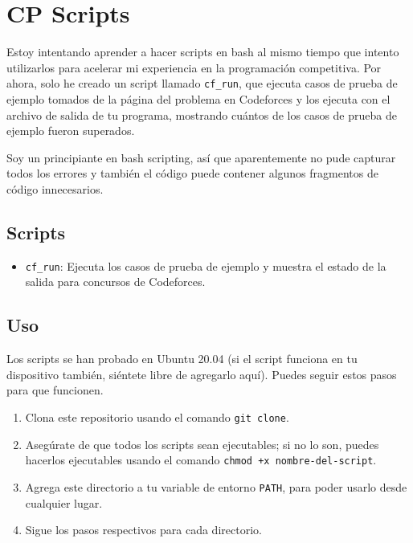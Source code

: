 \documentclass{article}
\begin{document}
\section*{CP Scripts}

Estoy intentando aprender a hacer scripts en bash al mismo tiempo que intento utilizarlos para acelerar mi experiencia en la programación competitiva. Por ahora, solo he creado un script llamado \texttt{cf\_run}, que ejecuta casos de prueba de ejemplo tomados de la página del problema en Codeforces y los ejecuta con el archivo de salida de tu programa, mostrando cuántos de los casos de prueba de ejemplo fueron superados.

Soy un principiante en bash scripting, así que aparentemente no pude capturar todos los errores y también el código puede contener algunos fragmentos de código innecesarios.

\subsection*{Scripts}

\begin{itemize}
    \item \texttt{cf\_run}: Ejecuta los casos de prueba de ejemplo y muestra el estado de la salida para concursos de Codeforces.
\end{itemize}

\subsection*{Uso}

Los scripts se han probado en Ubuntu 20.04 (si el script funciona en tu dispositivo también, siéntete libre de agregarlo aquí). Puedes seguir estos pasos para que funcionen.

\begin{enumerate}
    \item Clona este repositorio usando el comando \texttt{git clone}.
    \item Asegúrate de que todos los scripts sean ejecutables; si no lo son, puedes hacerlos ejecutables usando el comando \texttt{chmod +x nombre-del-script}.
    \item Agrega este directorio a tu variable de entorno \texttt{PATH}, para poder usarlo desde cualquier lugar.
    \item Sigue los pasos respectivos para cada directorio.
\end{enumerate}
\end{document}
